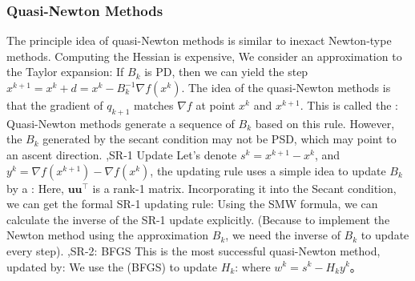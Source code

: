 \documentclass[12pt]{report}
\begin{document}
\subsubsection{Quasi-Newton Methods}
The principle idea of quasi-Newton methods is similar to inexact Newton-type methods. Computing the Hessian is expensive, We consider an approximation
to the Taylor expansion:
If $B_k$ is PD, then we can yield the step $x^{k+1}=x^k+d=x^k-B_k^{-1}\nabla f(x^k)$. The idea of the quasi-Newton methods is that the gradient of $q_{k+1}$ matches
$\nabla f$ at point $x^k$ and $x^{k+1}$. This is called the :
Quasi-Newton methods generate a sequence of $B_k$ based on this rule. However, the $B_k$ generated by the secant condition may not be PSD, which may point to an ascent direction.
\sep{SR-1 Update}
Let's denote $s^k=x^{k+1}-x^k$, and $y^k=\nabla f(x^{k+1})-\nabla f(x^k)$, the  updating rule uses a simple idea to update $B_k$ by a :
Here, $\boldsymbol{u}\boldsymbol{u}^\top$ is a rank-1 matrix. Incorporating it into the Secant condition, we can get the formal SR-1 updating rule:
Using the SMW formula, we can calculate the inverse of the SR-1 update explicitly. (Because to implement the Newton method using the approximation $B_k$, we need the inverse of $B_k$ to update every step).
\sep{SR-2: BFGS}
This is the most successful quasi-Newton method, updated by:
We use the  (BFGS) to update $H_k$:
where $w^k=s^k-H_ky^k$。
\end{document}
